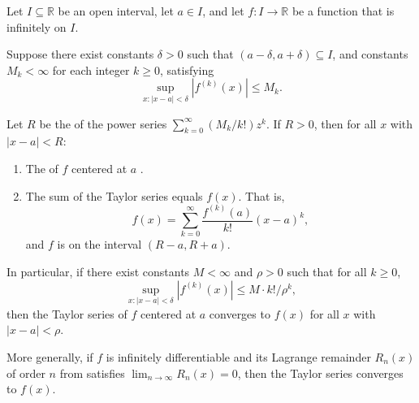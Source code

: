 \begin{theorem} \label{theorem:taylor_series_convergence_criterion_for_real_functions}
Let $I \subseteq \mathbb{R}$ be an open interval, let $a \in I$, and let $f : I \to \mathbb{R}$ be a function that is infinitely  on $I$.

Suppose there exist constants $\delta > 0$ such that $(a - \delta, a + \delta) \subseteq I$, and constants $M_k < \infty$ for each integer $k \geq 0$, satisfying
$$\sup_{x : |x - a| < \delta} |f^{(k)}(x)| \leq M_k.$$

Let $R$ be the  of the power series $\sum_{k=0}^\infty (M_k / k!) z^k$. If $R > 0$, then for all $x$ with $|x - a| < R$:
\begin{enumerate}
    \item The  of $f$ centered at $a$ .
    \item The sum of the Taylor series equals $f(x)$. That is,
        $$f(x) = \sum_{k=0}^\infty \frac{f^{(k)}(a)}{k!}(x - a)^k,$$
    and $f$ is  on the interval $(R-a, R+a)$.
\end{enumerate}

In particular, if there exist constants $M < \infty$ and $\rho > 0$ such that for all $k \geq 0$,
$$\sup_{x : |x - a| < \delta} |f^{(k)}(x)| \leq M \cdot k! / \rho^k,$$
then the Taylor series of $f$ centered at $a$ converges to $f(x)$ for all $x$ with $|x - a| < \rho$.

More generally, if $f$ is infinitely differentiable and its Lagrange remainder $R_n(x)$ of order $n$ from  satisfies $\lim_{n \to \infty} R_n(x) = 0$, then the Taylor series converges to $f(x)$.
\end{theorem}

